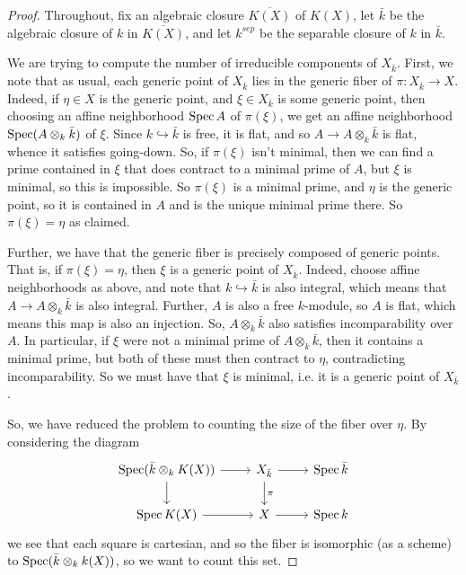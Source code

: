 \begin{proof}
	Throughout, fix an algebraic closure $\overline{K(X)}$ of $K(X)$, let $\bar{k}$ be the algebraic closure of $k$ in $\overline{K(X)}$, and let $k^{sep}$ be the separable closure of $k$ in $\bar{k}$.
	
	We are trying to compute the number of irreducible components of $X_{\bar{k}}$. First, we note that as usual, each generic point of $X_{\bar{k}}$ lies in the generic fiber of $\pi : X_{\bar{k}} \to X$. Indeed, if $\eta \in X$ is the generic point, and $\xi \in X_{\bar{k}}$ is some generic point, then choosing an affine neighborhood $\operatorname{Spec} A$ of $\pi(\xi)$, we get an affine neighborhood $\operatorname{Spec}(A \otimes_k \bar{k})$ of $\xi$. Since $k \hookrightarrow \bar{k}$ is free, it is flat, and so $A \to A \otimes_k \bar{k}$ is flat, whence it satisfies going-down. So, if $\pi(\xi)$ isn't minimal, then we can find a prime contained in $\xi$ that does contract to a minimal prime of $A$, but $\xi$ is minimal, so this is impossible. So $\pi(\xi)$ is a minimal prime, and $\eta$ is the generic point, so it is contained in $A$ and is the unique minimal prime there. So $\pi(\xi) = \eta$ as claimed.
	
	Further, we have that the generic fiber is precisely composed of generic points. That is, if $\pi(\xi) = \eta$, then $\xi$ is a generic point of $X_{\bar{k}}$. Indeed, choose affine neighborhoods as above, and note that $k \hookrightarrow \bar{k}$ is also integral, which means that $A \to A \otimes_k \bar{k}$ is also integral. Further, $A$ is also a free $k$-module, so $A$ is flat, which means this map is also an injection. So, $A \otimes_k \bar{k}$ also satisfies incomparability over $A$. In particular, if $\xi$ were not a minimal prime of $A \otimes_k \bar{k}$, then it contains a minimal prime, but both of these must then contract to $\eta$, contradicting incomparability. So we must have that $\xi$ is minimal, i.e. it is a generic point of $X_{\bar{k}}$.
	
	So, we have reduced the problem to counting the size of the fiber over $\eta$. By considering the diagram
	\[ \begin{tikzcd} \Spec(\bar{k} \otimes_k K(X)) \arrow[r] \arrow[d] & X_{\bar{k}} \arrow[r] \arrow[d,"\pi"] & \Spec \bar{k} \\ \Spec K(X) \arrow[r] & X \arrow[r] & \Spec k \end{tikzcd} \]
	we see that each square is cartesian, and so the fiber is isomorphic (as a scheme) to $\operatorname{Spec}(\bar{k} \otimes_k k(X))$, so we want to count this set.
	

\end{proof}
